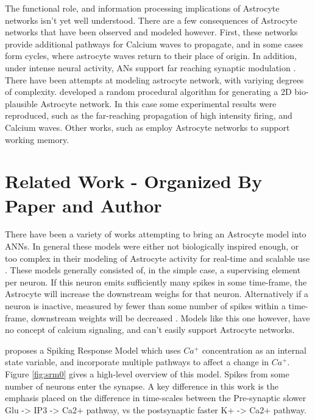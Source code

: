     The functional role, and information processing implications of Astrocyte
    networks isn't yet well understood. There are a few consequences of
    Astrocyte networks that have been observed and modeled however. First, these
    networks provide additional pathways for Calcium waves to propagate, and in
    some cases form cycles, where astrocyte waves return to their place of
    origin. In addition, under intense neural activity, ANs support far reaching
    synaptic modulation \cite{postnov_2009}. There have been attempts at
    modeling astrocyte network, with variying degrees of
    complexity. \cite{postnov_2009} developed a random procedural algorithm for
    generating a 2D bio-plausible Astrocyte network. In this case some
    experimental results were reproduced, such as the far-reaching propagation
    of high intensity firing, and Calcium waves. Other works, such as \cite{gordleeva_2021} employ
    Astrocyte networks to support working memory.

    
    \section{Related Work - Organized By Paper and Author}
    
    There have been a variety of works attempting to bring an Astrocyte model
    into ANNs. In general these models were either not biologically inspired
    enough, or too complex in their modeling of Astrocyte activity for real-time
    and scalable use \cite{bassam_2015}. These models generally consisted of,
    in the simple case, a supervising element per neuron. If this neuron emits
    sufficiently many spikes in some time-frame, the Astrocyte will increase the
    downstream weighs for that neuron. Alternatively if a neuron is inactive,
    measured by fewer than some number of spikes within a time-frame, downstream
    weights will be decreased \cite{mesejo_2015}. Models like this one
    however, have no concept of calcium signaling, and can't easily support
    Astrocyte networks.
    
    \cite{bassam_2015} proposes a Spiking Response Model which uses $Ca^+$
    concentration as an internal state variable, and incorporate multiple
    pathways to affect a change in $Ca^+$. Figure \ref{fig:srm0} gives a
    high-level overview of this model. Spikes from some number of neurons enter
    the synapse. A key difference in this work is the emphasis placed on the
    difference in time-scales between the Pre-synaptic slower Glu -> IP3 -> Ca2+
    pathway, vs the postsynaptic faster K+ -> Ca2+ pathway.
    
